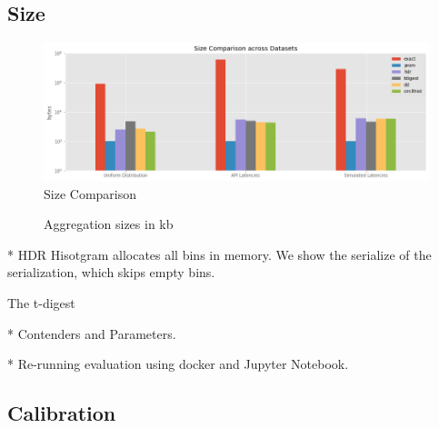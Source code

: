 \documentclass{article}
\theoremstyle{plain}
\theoremstyle{remark}
\begin{document}
{\clearpage
\subsection{Size}

\begin{figure}[t!]
  \includegraphics[width=\textwidth]{evaluation/images/all_size.png}
  \caption{Size Comparison}
\end{figure}

\begin{figure}
  \centering
  
  \caption{Aggregation sizes in kb}
\end{figure}

* HDR Hisotgram allocates all bins in memory. We show the serialize of the serialization, which skips empty bins.

The t-digest

* Contenders and Parameters.

* Re-running evaluation using docker and Jupyter Notebook.


\clearpage
\subsection{Calibration}

}
\end{document}
